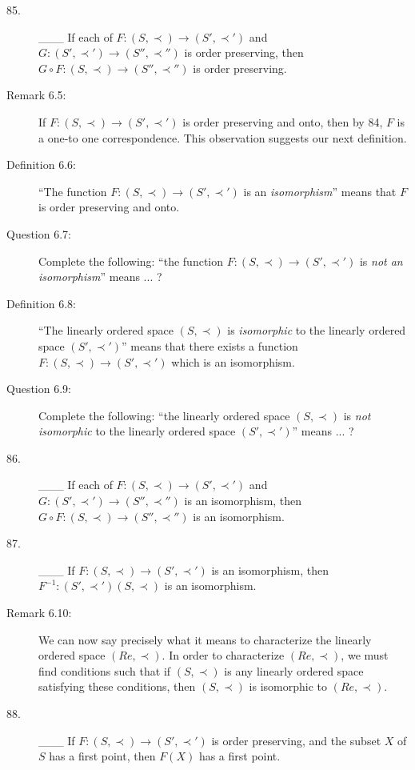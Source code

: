 \documentclass{book}
\begin{document}
\begin{description}
\item[85.] \_\_\_ If each of $F: (S, \prec) \rightarrow (S', \prec ')$ and $G: (S', \prec ') \rightarrow (S'', \prec '')$ is order preserving, then $G \circ F: (S, \prec ) \rightarrow (S'', \prec '')$ is order preserving.

\item[Remark 6.5:] If $F: (S, \prec) \rightarrow (S', \prec ')$ is order preserving and onto, then by 84, $F$ is a one-to one correspondence. This observation suggests our next definition.

\item[Definition 6.6:] ``The function $F: (S, \prec) \rightarrow (S', \prec ')$ is an \emph{isomorphism}'' means that $F$ is order preserving and onto.

\item[Question 6.7:] Complete the following: ``the function $F: (S, \prec) \rightarrow (S', \prec ')$ is \emph{not an isomorphism}'' means ... ?

\item[Definition 6.8:] ``The linearly ordered space $(S, \prec)$ is \emph{isomorphic} to the linearly ordered space $(S', \prec ')$'' means that there exists a function $F: (S, \prec) \rightarrow (S', \prec ')$ which is an isomorphism.

\item[Question 6.9:] Complete the following: ``the linearly ordered space $(S, \prec)$ is \emph{not isomorphic} to the linearly ordered space $(S', \prec ')$'' means ... ?

\item[86.] \_\_\_ If each of $F: (S, \prec) \rightarrow (S', \prec ')$ and $G: (S', \prec ') \rightarrow (S'', \prec '')$ is an isomorphism, then $G \circ F: (S, \prec) \rightarrow (S'', \prec '')$ is an isomorphism.

\item[87.] \_\_\_ If $F: (S, \prec) \rightarrow (S', \prec ')$ is an isomorphism, then $F^{-1}: (S', \prec ') (S, \prec)$ is an isomorphism.

\item[Remark 6.10:] We can now say precisely what it means to characterize the linearly ordered space $(Re, \prec)$. In order to characterize $(Re, \prec)$, we must find conditions such that if $(S, \prec)$ is any linearly ordered space satisfying these conditions, then $(S, \prec)$ is isomorphic to $(Re, \prec)$.

\item[88.] \_\_\_ If $F: (S, \prec) \rightarrow (S', \prec ')$ is order preserving, and the subset $X$ of $S$ has a first point, then $F(X)$ has a first point.


\end{description}
\end{document}
